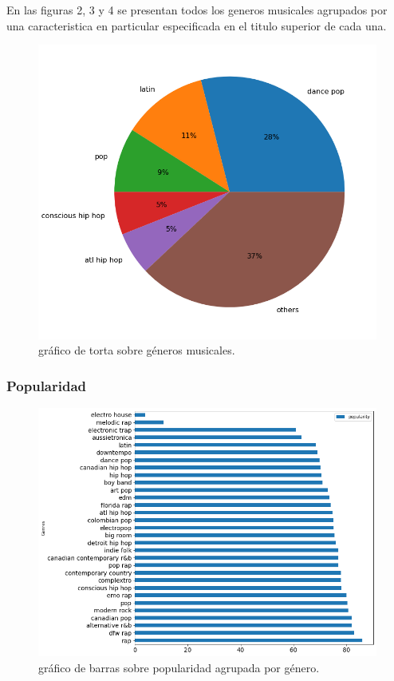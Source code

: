 \documentclass{article}
\begin{document}
En las figuras 2, 3 y 4 se presentan todos los generos musicales agrupados por
una caracteristica en particular especificada en el titulo superior de cada una.

\begin{figure}[h]
  \centering
  \includegraphics[scale=0.4]{a}
  \caption{gráfico de torta sobre géneros musicales.}
\end{figure}

\newpage
\subsubsection{Popularidad}

\begin{figure}[h]
  \centering
  \includegraphics[scale=0.4]{b}
  \caption{gráfico de barras sobre popularidad agrupada por género.}
\end{figure}
\end{document}
